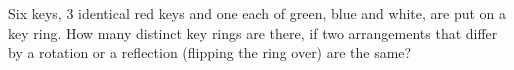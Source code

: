 Six keys, $3$ identical red keys and one each of green, blue and white, are put on a key ring. How many distinct key rings are there, if two arrangements that differ by a rotation or a reflection (flipping the ring over) are the same?
